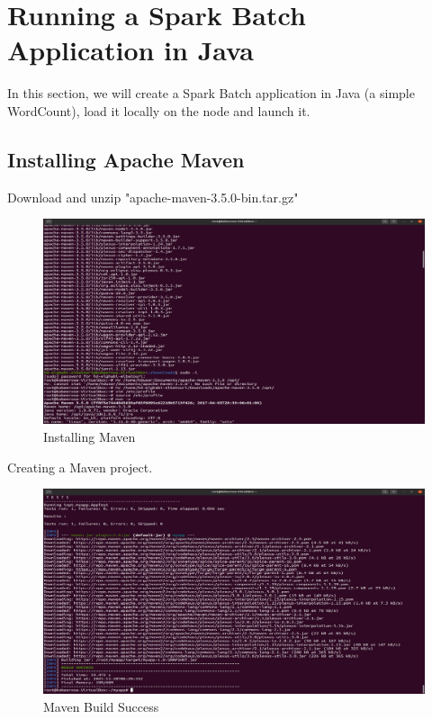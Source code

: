 \chapter{Running a Spark Batch Application in Java}
\par In this section, we will create a Spark Batch application in Java (a simple WordCount), load it locally on the node and launch it.
\begin{spacing}{1.2}
\section{Installing Apache Maven}

\par Download and unzip "apache-maven-3.5.0-bin.tar.gz"
\\
\begin{figure}[!htb] 
\begin{center} 
\includegraphics[width=1\linewidth]{Big_Data/Spark/Running a Spark Batch app in Java/Installing Maven} 
\end{center} 
\caption{Installing Maven} 
\end{figure} 
\FloatBarrier



\par Creating a Maven project.
\\
\begin{figure}[!htb] 
\begin{center} 
\includegraphics[width=1\linewidth]{Big_Data/Spark/Running a Spark Batch app in Java/Maven Build Success} 
\end{center} 
\caption{Maven Build Success} 
\end{figure} 
\FloatBarrier


\end{spacing}
